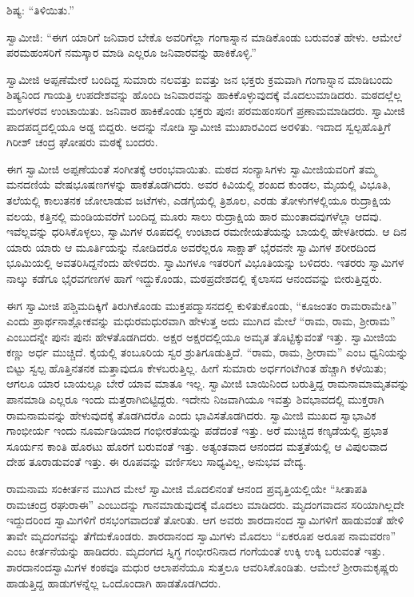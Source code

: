  ಶಿಷ್ಯ: “ತಿಳಿಯಿತು.” 

 ಸ್ವಾಮೀಜಿ: “ಈಗ ಯಾರಿಗೆ ಜನಿವಾರ ಬೇಕೊ ಅವರಿಗೆಲ್ಲಾ ಗಂಗಾಸ್ನಾನ ಮಾಡಿಕೊಂಡು ಬರುವಂತೆ ಹೇಳು. ಆಮೇಲೆ ಪರಮಹಂಸರಿಗೆ ನಮಸ್ಕಾರ ಮಾಡಿ ಎಲ್ಲರೂ ಜನಿವಾರವನ್ನು ಹಾಕಿಕೊಳ್ಳಿ.” 

 ಸ್ವಾಮೀಜಿ ಅಪ್ಪಣೆಮೇರೆ ಬಂದಿದ್ದ ಸುಮಾರು ನಲವತ್ತು ಐವತ್ತು ಜನ ಭಕ್ತರು ಕ್ರಮವಾಗಿ ಗಂಗಾಸ್ನಾನ ಮಾಡಿಬಂದು ಶಿಷ್ಯನಿಂದ ಗಾಯತ್ರಿ ಉಪದೇಶವನ್ನು ಹೊಂದಿ ಜನಿವಾರವನ್ನು ಹಾಕಿಕೊಳ್ಳುವುದಕ್ಕೆ ಮೊದಲುಮಾಡಿದರು. ಮಠದಲ್ಲೆಲ್ಲ ಮಂಗಳರವ ಉಂಟಾಯಿತು. ಜನಿವಾರ ಹಾಕಿಕೊಂಡು ಭಕ್ತರು ಪುನಃ ಪರಮಹಂಸರಿಗೆ ಪ್ರಣಾಮಮಾಡಿದರು. ಸ್ವಾಮೀಜಿ ಪಾದಪದ್ಮದಲ್ಲಿಯೂ ಅಡ್ಡ ಬಿದ್ದರು. ಅದನ್ನು ನೋಡಿ ಸ್ವಾಮೀಜಿ ಮುಖಾರವಿಂದ ಅರಳಿತು. ಇದಾದ ಸ್ವಲ್ಪಹೊತ್ತಿಗೆ ಗಿರೀಶ್ ಚಂದ್ರ ಘೋಷರು ಮಠಕ್ಕೆ ಬಂದರು. 

 ಈಗ ಸ್ವಾಮೀಜಿ ಅಪ್ಪಣೆಯಂತೆ ಸಂಗೀತಕ್ಕೆ ಆರಂಭವಾಯಿತು. ಮಠದ ಸಂನ್ಯಾಸಿಗಳು ಸ್ವಾಮೀಜಿಯವರಿಗೆ ತಮ್ಮ ಮನದಣಿಯೆ ವೇಷಭೂಷಣಗಳನ್ನು ಹಾಕತೊಡಗಿ\-ದರು. ಅವರ ಕಿವಿಯಲ್ಲಿ ಶಂಖದ ಕುಂಡಲ, ಮೈಯಲ್ಲಿ ವಿಭೂತಿ, ತಲೆಯಲ್ಲಿ ಕಾಲುತನಕ ಜೋಲಾಡುವ ಜಟೆಗಳು, ಎಡಗೈಯಲ್ಲಿ ತ್ರಿಶೂಲ, ಎರಡು ತೋಳುಗಳಲ್ಲಿಯೂ ರುದ್ರಾಕ್ಷಿಯ ವಲಯ, ಕತ್ತಿನಲ್ಲಿ ಮಂಡಿಯವರೆಗೆ ಬಂದಿದ್ದ ಮೂರು ಸಾಲು ರುದ್ರಾಕ್ಷಿಯ ಹಾರ ಮುಂತಾದವುಗಳೆಲ್ಲಾ ಆದವು. ಇವೆಲ್ಲವನ್ನು ಧರಿಸಿಕೊಳ್ಳಲು, ಸ್ವಾಮಿಗಳ ರೂಪದಲ್ಲಿ ಉಂಟಾದ ರಮಣೀಯತೆಯನ್ನು ಬಾಯಲ್ಲಿ ಹೇಳತೀರದು. ಆ ದಿನ ಯಾರು ಯಾರು ಆ ಮೂರ್ತಿಯನ್ನು ನೋಡಿದರೊ ಅವರೆಲ್ಲರೂ ಸಾಕ್ಷಾತ್ ಭೈರವನೇ‌ ಸ್ವಾಮಿಗಳ ಶರೀರದಿಂದ ಭೂಮಿಯಲ್ಲಿ ಅವತರಿಸಿದ್ದನೆಂದು ಹೇಳಿದರು. ಸ್ವಾಮಿಗಳೂ ಇತರರಿಗೆ ವಿಭೂತಿಯನ್ನು ಬಳಿದರು. ಇತರರು ಸ್ವಾಮಿಗಳ ನಾಲ್ಕು ಕಡೆಗೂ ಭೈರವಗಣಗಳ ಹಾಗೆ ಇದ್ದುಕೊಂಡು, ಮಠಪ್ರದೇಶದಲ್ಲಿ ಕೈಲಾಸದ ಆನಂದವನ್ನು ಬೀರುತ್ತಿದ್ದರು. 

 ಈಗ ಸ್ವಾಮೀಜಿ ಪಶ್ಚಿಮದಿಕ್ಕಿಗೆ ತಿರುಗಿಕೊಂಡು ಮುಕ್ತಪದ್ಮಾಸನದಲ್ಲಿ ಕುಳಿತುಕೊಂಡು, “ಕೂಜಂತಂ ರಾಮರಾಮೇತಿ” ಎಂದು ಪ್ರಾರ್ಥನಾಶ್ಲೋಕವನ್ನು ಮಧುರಮಧುರವಾಗಿ ಹೇಳುತ್ತ ಅದು ಮುಗಿದ ಮೇಲೆ “ರಾಮ, ರಾಮ, ಶ‍್ರೀರಾಮ” ಎಂಬುದನ್ನೇ ಪುನಃ ಪುನಃ ಹೇಳತೊಡಗಿದರು. ಅಕ್ಷರ ಅಕ್ಷರದಲ್ಲಿಯೂ ಅಮೃತ ತೊಟ್ಟಿಕ್ಕುವಂತೆ ಇತ್ತು. ಸ್ವಾಮೀಜಿಯ ಕಣ್ಣು ಅರ್ಧ ಮುಚ್ಚಿದೆ. ಕೈಯಲ್ಲಿ ತಂಬೂರಿಯ ಸ್ವರ ಶ್ರುತಿಗೂಡುತ್ತಿದೆ. “ರಾಮ, ರಾಮ, ಶ‍್ರೀರಾಮ” ಎಂಬ ಧ್ವನಿಯನ್ನು ಬಿಟ್ಟು ಸ್ವಲ್ಪ ಹೊತ್ತಿನತನಕ ಮತ್ತಾವುದೂ ಕೇಳಬರುತ್ತಿಲ್ಲ. ಹೀಗೆ ಸುಮಾರು ಅರ್ಧಗಂಟೆಗಿಂತ ಹೆಚ್ಚಾಗಿ ಕಳೆಯಿತು; ಆಗಲೂ ಯಾರ ಬಾಯಲ್ಲೂ ಬೇರೆ ಯಾವ ಮಾತೂ ಇಲ್ಲ. ಸ್ವಾಮೀಜಿ ಬಾಯಿನಿಂದ ಬರುತ್ತಿದ್ದ ರಾಮನಾಮಾಮೃತವನ್ನು ಪಾನಮಾಡಿ ಎಲ್ಲರೂ ಇಂದು ಮತ್ತರಾಗಿಬಿಟ್ಟಿದ್ದರು. ಇದೇನು ನಿಜವಾಗಿಯೂ ಇವತ್ತು ಶಿವಭಾವದಲ್ಲಿ ಮುಕ್ತರಾಗಿ ರಾಮನಾಮವನ್ನು ಹೇಳುವುದಕ್ಕೆ ತೊಡಗಿದರೊ ಎಂದು ಭಾವಿಸತೊಡಗಿದರು. ಸ್ವಾಮೀಜಿ ಮುಖದ ಸ್ವಾಭಾವಿಕ ಗಾಂಭೀರ್ಯ ಇಂದು ನೂರ್ಮಡಿಯಾದ ಗಂಭೀರತೆಯನ್ನು ಪಡೆದಂತೆ ಇತ್ತು. ಅರೆ ಮುಚ್ಚಿದ ಕಣ್ಕಡೆಯಲ್ಲಿ ಪ್ರಭಾತ ಸೂರ್ಯನ ಕಾಂತಿ ಹೊರಟು ಹೊರಗೆ ಬರುವಂತೆ ಇತ್ತು. ಅತ್ಯಂತವಾದ ಆನಂದದ ಮತ್ತತೆಯಲ್ಲಿ ಆ ವಿಪುಲವಾದ ದೇಹ ತೂರಾಡುವಂತೆ ಇತ್ತು. ಈ ರೂಪವನ್ನು ವರ್ಣಿಸಲು ಸಾಧ್ಯವಿಲ್ಲ, ಅನುಭವ ವೇದ್ಯ. 

 ರಾಮನಾಮ ಸಂಕೀರ್ತನ ಮುಗಿದ ಮೇಲೆ ಸ್ವಾಮೀಜಿ ಮೊದಲಿನಂತೆ ಆನಂದ ಪ್ರವೃತ್ತಿಯಲ್ಲಿಯೇ “ಸೀತಾಪತಿ ರಾಮಚಂದ್ರ ರಘುರಾಈ” ಎಂಬುದನ್ನು ಗಾನಮಾಡುವುದಕ್ಕೆ ಮೊದಲು ಮಾಡಿದರು. ಮೃದಂಗವಾದನ ಸರಿಯಾಗಿಲ್ಲದೇ ಇದ್ದುದರಿಂದ ಸ್ವಾಮಿಗಳಿಗೆ ರಸಭಂಗವಾದಂತೆ ತೋರಿತು. ಆಗ ಅವರು ಶಾರದಾನಂದ ಸ್ವಾಮಿಗಳಿಗೆ ಹಾಡುವಂತೆ ಹೇಳಿ ತಾವೇ ಮೃದಂಗವನ್ನು ತೆಗೆದುಕೊಂಡರು. ಶಾರದಾನಂದ ಸ್ವಾಮಿಗಳು ಮೊದಲು “ಏಕರೂಪ ಅರೂಪ ನಾಮವರಣ” ಎಂಬ ಕೀರ್ತನೆಯನ್ನು ಹಾಡಿದರು. ಮೃದಂಗದ ಸ್ನಿಗ್ಧ ಗಂಭೀರನಿನಾದ ಗಂಗೆಯಂತೆ ಉಕ್ಕಿ ಉಕ್ಕಿ ಬರುವಂತೆ ಇತ್ತು. ಶಾರದಾನಂದಸ್ವಾಮಿಗಳ ಕಂಠವೂ ಮಧುರ ಆಲಾಪನೆಯೂ ಸುತ್ತಲೂ ಆವರಿಸಿಕೊಂಡಿತು. ಆಮೇಲೆ ಶ‍್ರೀರಾಮಕೃಷ್ಣರು ಹಾಡುತ್ತಿದ್ದ ಹಾಡುಗಳನ್ನೆಲ್ಲ ಒಂದೊಂದಾಗಿ ಹಾಡತೊಡಗಿದರು. 

